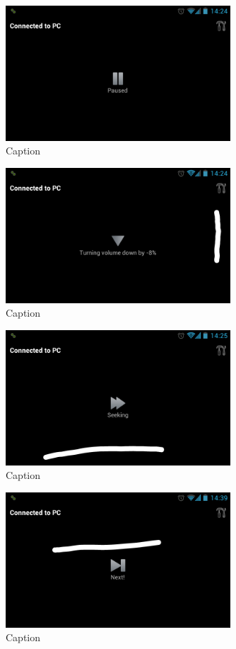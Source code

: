 \documentclass[a4paper,12pt]{article}
\begin{document}
\begin{figure}[H]
\centering
\includegraphics[width=0.75\textwidth]{Screenshot_8.png}
\caption{Caption}
\end{figure}

\begin{figure}[H]
\centering
\includegraphics[width=0.75\textwidth]{Screenshot_9.png}
\caption{Caption}
\end{figure}

\begin{figure}[H]
\centering
\includegraphics[width=0.75\textwidth]{Screenshot_10.png}
\caption{Caption}
\end{figure}

\begin{figure}[H]
\centering
\includegraphics[width=0.75\textwidth]{Screenshot_11.png}
\caption{Caption}
\end{figure}
\end{document}
